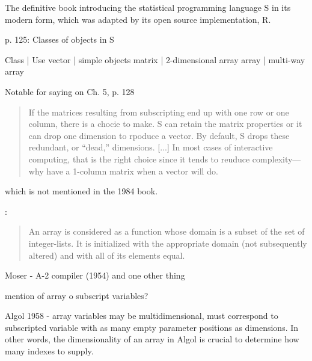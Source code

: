The definitive book introducing the statistical programming language S in its
modern form, which was adapted by its open source implementation, R.

p. 125: Classes of objects in S

Class | Use
vector | simple objects
matrix | 2-dimensional array
array | multi-way array

Notable for saying on Ch. 5, p. 128

\begin{quote}
If the matrices resulting from subscripting end up with one row or one
column, there is a chocie to make. S can retain the matrix properties or it can
drop one dimension to rpoduce a vector. By default, S drops these redundant,
or ``dead,'' dimensions. [...]
In most cases of interactive computing, that is the right choice since it tends to
reuduce complexity---why have a 1-column matrix when a vector will do.
\end{quote}

which is not mentioned in the 1984 book.







\cite{Landin1965}:
\begin{quote}
An array is considered as a function whose domain is a subset of the set of integer-lists.
It is initialized with the appropriate domain (not subsequently altered) and with all of its elements equal.
\end{quote}


Moser - A-2 compiler (1954) and one other thing

mention of array o subscript variables?


Algol 1958 - array variables may be multidimensional, must correspond to subscripted variable with as many empty parameter positions as dimensions.
In other words, the dimensionality of an array in Algol is crucial to determine how many indexes to supply.

